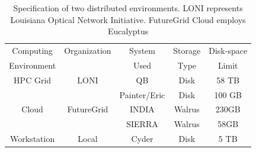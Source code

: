 \documentclass{cpeauth}
\begin{document}


\begin{table}
\small
\begin{tabular}{|c|c|c|c|c|} 
\hline 
Computing & Organization & System &  Storage & Disk-space  \\
Environment & & Used & Type  &  Limit \\ \hline
HPC Grid & LONI & QB & Disk & 58 TB   \\
 &  &  Painter/Eric  & Disk &  100 GB  \\
Cloud & FutureGrid & INDIA & Walrus & 230GB \\
         &                    &  SIERRA & Walrus & 58GB \\ 
Workstation &  Local   &  Cyder & Disk       & 5 TB\\

 \hline


 \end{tabular}
\caption{Specification of two distributed environments. LONI represents Louisiana Optical Network Initiative\cite{loni}. FutureGrid Cloud\cite{futuregrid} employs Eucalyptus}
\label{table:two-systems} 
\end{table}


\end{document}

